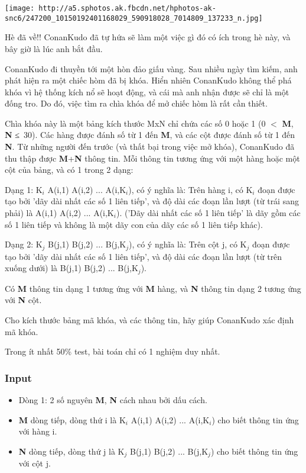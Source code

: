 


\texttt{[image: http://a5.sphotos.ak.fbcdn.net/hphotos-ak-snc6/247200\_10150192401168029\_590918028\_7014809\_137233\_n.jpg]}

Hè đã về!! ConanKudo đã tự hứa sẽ làm một việc gì đó có ích trong hè này, và bây giờ là lúc anh bắt đầu.

ConanKudo đi thuyền tới một hòn đảo giấu vàng. Sau nhiều ngày tìm kiếm, anh phát hiện ra một chiếc hòm đã bị khóa. Hiển nhiên ConanKudo không thể phá khóa vì hệ thống kích nổ sẽ hoạt động, và cái mà anh nhận được sẽ chỉ là một đống tro. Do đó, việc tìm ra chìa khóa để mở chiếc hòm là rất cần thiết.

Chìa khóa này là một bảng kích thước MxN chỉ chứa các số 0 hoặc 1 (0 $<$ \textbf{M}, \textbf{N} ≤ 30). Các hàng được đánh số từ 1 đến \textbf{M}, và các cột được đánh số từ 1 đến \textbf{N}. Từ những người đến trước (và thất bại trong việc mở khóa), ConanKudo đã thu thập được \textbf{M}+\textbf{N} thông tin. Mỗi thông tin tương ứng với một hàng hoặc một cột của bảng, và có 1 trong 2 dạng:

Dạng 1: K$_i$ A(i,1) A(i,2) ... A(i,K$_i$), có ý nghĩa là: Trên hàng i, có K$_i$ đoạn được tạo bởi 'dãy dài nhất các số 1 liên tiếp', và độ dài các đoạn lần lượt (từ trái sang phải) là A(i,1) A(i,2) ... A(i,K$_i$). ('Dãy dài nhất các số 1 liên tiếp' là dãy gồm các số 1 liên tiếp và không là một dãy con của dãy các số 1 liên tiếp khác).

Dạng 2: K$_j$ B(j,1) B(j,2) ... B(j,K$_j$), có ý nghĩa là: Trên cột j, có K$_j$ đoạn được tạo bởi 'dãy dài nhất các số 1 liên tiếp', và độ dài các đoạn lần lượt (từ trên xuống dưới) là B(j,1) B(j,2) ... B(j,K$_j$).

Có \textbf{M} thông tin dạng 1 tương ứng với \textbf{M} hàng, và \textbf{N} thông tin dạng 2 tương ứng với \textbf{N} cột.

Cho kích thước bảng mã khóa, và các thông tin, hãy giúp ConanKudo xác định mã khóa.

Trong ít nhất 50\% test, bài toán chỉ có 1 nghiệm duy nhất.

\subsubsection{Input}
\begin{itemize}
	\item Dòng 1: 2 số nguyên \textbf{M}, \textbf{N} cách nhau bởi dấu cách.
	\item \textbf{M} dòng tiếp, dòng thứ i là K$_i$ A(i,1) A(i,2) ... A(i,K$_i$) cho biết thông tin ứng với hàng i.
	\item \textbf{N} dòng tiếp, dòng thứ j là K$_j$ B(j,1) B(j,2) ... B(j,K$_j$) cho biết thông tin ứng với cột j.
\end{itemize}

